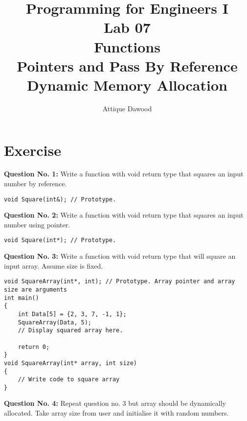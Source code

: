\documentclass[12pt,a4paper]{article}
\title{\vspace{-2cm}Programming for Engineers I\\Lab 07\\Functions\\Pointers and Pass By Reference\\Dynamic Memory Allocation}
\author{Attique Dawood}
\begin{document}
\maketitle
\section{Exercise}
\textbf{Question No. 1:} Write a function with void return type that squares an input number by reference.
\begin{lstlisting}[caption={Square by reference}]
void Square(int&); // Prototype.
\end{lstlisting}
\textbf{Question No. 2:} Write a function with void return type that squares an input number using pointer.
\begin{lstlisting}[caption={Square using pointer}]
void Square(int*); // Prototype.
\end{lstlisting}
\textbf{Question No. 3:} Write a function with void return type that will square an input array. Assume size is fixed.
\begin{lstlisting}[caption={Square using array pointer}]
void SquareArray(int*, int); // Prototype. Array pointer and array size are arguments
int main()
{
	int Data[5] = {2, 3, 7, -1, 1};
	SquareArray(Data, 5);
	// Display squared array here.

	return 0;
}
void SquareArray(int* array, int size)
{
	// Write code to square array
}
\end{lstlisting}
\textbf{Question No. 4:} Repeat question no. 3 but array should be dynamically allocated. Take array size from user and initialise it with random numbers.
\end{document}
